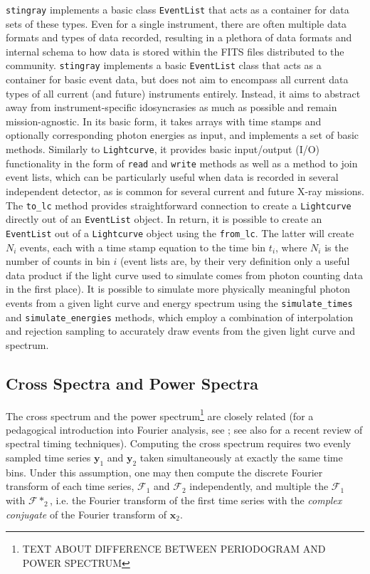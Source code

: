 \documentclass[12pt]{emulateapj}
\newcommand{\stingray}{\texttt{stingray}\xspace}
\newcommand{\lightcurve}{\texttt{Lightcurve}\xspace}
\newcommand{\eventlist}{\texttt{EventList}\xspace}
\begin{document}
\stingray implements a basic class \eventlist that acts as a container for data sets of these types. Even for a single instrument, there are often multiple data formats and types of data recorded, resulting in a plethora of data formats and internal schema to how data is stored within the FITS files distributed to the community. 
\stingray implements a basic \eventlist class that acts as a container for basic event data, but does not aim to encompass all current data types of all current (and future) instruments entirely. Instead, it aims to abstract away from instrument-specific idosyncrasies as much as possible and remain mission-agnostic. In its basic form, it takes arrays with time stamps and optionally corresponding photon energies as input, and implements a set of basic methods. Similarly to \lightcurve, it provides basic input/output (I/O) functionality in the form of \texttt{read} and \texttt{write} methods as well as a method to join event lists, which can be particularly useful when data is recorded in several independent detector, as is common for several current and future X-ray missions. The \verb|to_lc| method provides straightforward connection to create a \lightcurve directly out of an \eventlist object. In return, it is possible to create an \eventlist out of a \lightcurve object using the \verb|from_lc|. The latter will create $N_i$ events, each with a time stamp equation to the time bin $t_i$, where $N_i$ is the number of counts in bin $i$ (event lists are, by their very definition only a useful data product if the light curve used to simulate comes from photon counting data in the first place). 
It is possible to simulate more physically meaningful photon events from a given light curve and energy spectrum using the \verb|simulate_times| and \verb|simulate_energies| methods, which employ a combination of interpolation and rejection sampling to accurately draw events from the given light curve and spectrum.


\subsection{Cross Spectra and Power Spectra}
\label{sec:csps}

The cross spectrum and the power spectrum\footnote{TEXT ABOUT DIFFERENCE BETWEEN PERIODOGRAM AND POWER SPECTRUM} are closely related (for a pedagogical introduction into Fourier analysis, see \citealt{vanderklis1989}; see also \citealt{uttley2014} for a recent review of spectral timing techniques). Computing the cross spectrum requires two evenly sampled time series $\mathbf{y}_1$ and $\mathbf{y}_2$ taken simultaneously at exactly the same time bins. Under this assumption, one may then compute the discrete Fourier transform of each time series, $\mathcal{F}_1$ and $\mathcal{F}_2$ independently, and multiple the $\mathcal{F}_1$ with $\mathcal{F}*_2$, i.e. the Fourier transform of the first time series with the \textit{complex conjugate} of the Fourier transform of $\mathbf{x}_2$. 
\end{document}

